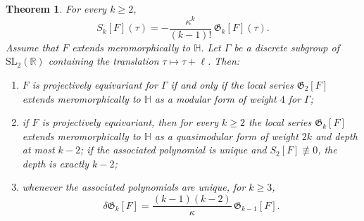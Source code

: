\documentclass[11pt]{amsart}
\newtheorem{thm}{Theorem}[section]
\theoremstyle{definition}
\theoremstyle{remark}
\numberwithin{equation}{section}
\begin{document}
\begin{thm}\label{thm:Grunsky-quasimodular}
For every $k\geq2$,
\begin{equation}\label{eq:moment-Schwarzian}
S_k[F](\tau)
=
-\frac{\kappa^k}{(k-1)!}\,\mathfrak G_k[F](\tau).
\end{equation}
Assume that $F$ extends meromorphically to $\mathbb H$. Let $\Gamma$ be a discrete subgroup of $\mathrm{SL}_2(\mathbb R)$ containing the translation $\tau\mapsto\tau+\ell$. Then:
\begin{enumerate}
\item $F$ is projectively equivariant for $\Gamma$ if and only if the local series $\mathfrak G_2[F]$ extends meromorphically to $\mathbb H$ as a modular form of weight $4$ for $\Gamma$;
\item if $F$ is projectively equivariant, then for every $k\geq2$ the local series $\mathfrak G_k[F]$ extends meromorphically to $\mathbb H$ as a quasimodular form of weight $2k$ and depth at most $k-2$; if the associated polynomial is unique and $S_2[F]\not\equiv0$, the depth is exactly $k-2$;
\item whenever the associated polynomials are unique, for $k\geq3$,
\begin{equation}\label{eq:Grunsky-lowering}
\delta\mathfrak G_k[F]
=
\frac{(k-1)(k-2)}{\kappa}\,\mathfrak G_{k-1}[F].
\end{equation}
\end{enumerate}
\end{thm}
\end{document}
